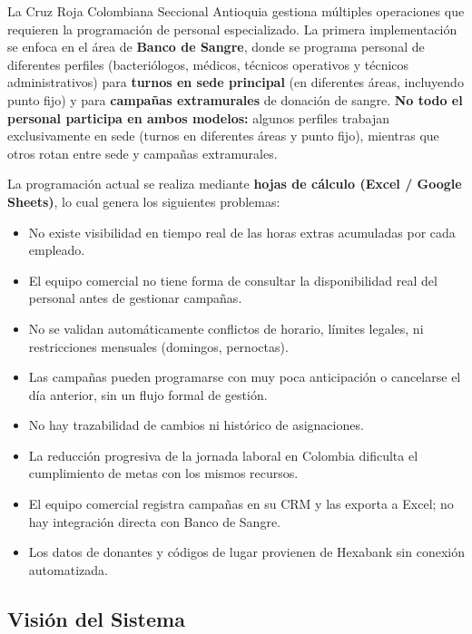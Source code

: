 \documentclass[9pt,a4paper]{extarticle}
\begin{document}
La Cruz Roja Colombiana Seccional Antioquia gestiona m\'{u}ltiples operaciones que requieren la programaci\'{o}n de personal especializado. La primera implementaci\'{o}n se enfoca en el \'{a}rea de \textbf{Banco de Sangre}, donde se programa personal de diferentes perfiles (bacteri\'{o}logos, m\'{e}dicos, t\'{e}cnicos operativos y t\'{e}cnicos administrativos) para \textbf{turnos en sede principal} (en diferentes \'{a}reas, incluyendo punto fijo) y para \textbf{campañas extramurales} de donaci\'{o}n de sangre. \textbf{No todo el personal participa en ambos modelos:} algunos perfiles trabajan exclusivamente en sede (turnos en diferentes \'{a}reas y punto fijo), mientras que otros rotan entre sede y campañas extramurales.

La programaci\'{o}n actual se realiza mediante \textbf{hojas de c\'{a}lculo (Excel / Google Sheets)}, lo cual genera los siguientes problemas:

\begin{itemize}[leftmargin=2em]
    \item No existe visibilidad en tiempo real de las horas extras acumuladas por cada empleado.
    \item El equipo comercial no tiene forma de consultar la disponibilidad real del personal antes de gestionar campañas.
    \item No se validan autom\'{a}ticamente conflictos de horario, l\'{i}mites legales, ni restricciones mensuales (domingos, pernoctas).
    \item Las campañas pueden programarse con muy poca anticipaci\'{o}n o cancelarse el d\'{i}a anterior, sin un flujo formal de gesti\'{o}n.
    \item No hay trazabilidad de cambios ni hist\'{o}rico de asignaciones.
    \item La reducci\'{o}n progresiva de la jornada laboral en Colombia dificulta el cumplimiento de metas con los mismos recursos.
    \item El equipo comercial registra campañas en su CRM y las exporta a Excel; no hay integraci\'{o}n directa con Banco de Sangre.
    \item Los datos de donantes y c\'{o}digos de lugar provienen de Hexabank sin conexi\'{o}n automatizada.
\end{itemize}

\subsection{Visi\'{o}n del Sistema}
\end{document}
